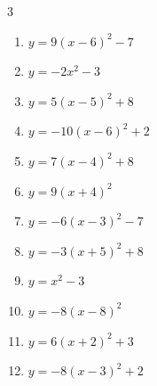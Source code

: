 \begin{multicols}{3}
\begin{enumerate}
  \item $\displaystyle y=9\left( x-6\right)^{2}-7$

        \phantom{$\displaystyle 頂点\left( 6 , -7 \right)$}

  \item $\displaystyle y=-2x^{2}-3$

        \phantom{$\displaystyle 頂点\left( 0 , -3 \right)$}

  \item $\displaystyle y=5\left( x-5\right)^{2}+8$

        \phantom{$\displaystyle 頂点\left( 5 , 8 \right)$}

  \item $\displaystyle y=-10\left( x-6\right)^{2}+2$

        \phantom{$\displaystyle 頂点\left( 6 , 2 \right)$}

  \item $\displaystyle y=7\left( x-4\right)^{2}+8$

        \phantom{$\displaystyle 頂点\left( 4 , 8 \right)$}

  \item $\displaystyle y=9\left( x+4\right)^{2}$

        \phantom{$\displaystyle 頂点\left( -4 , 0 \right)$}

  \item $\displaystyle y=-6\left( x-3\right)^{2}-7$

        \phantom{$\displaystyle 頂点\left( 3 , -7 \right)$}

  \item $\displaystyle y=-3\left( x+5\right)^{2}+8$

        \phantom{$\displaystyle 頂点\left( -5 , 8 \right)$}

  \item $\displaystyle y=x^{2}-3$

        \phantom{$\displaystyle 頂点\left( 0 , -3 \right)$}

  \item $\displaystyle y=-8\left( x-8\right)^{2}$

        \phantom{$\displaystyle 頂点\left( 8 , 0 \right)$}

  \item $\displaystyle y=6\left( x+2\right)^{2}+3$

        \phantom{$\displaystyle 頂点\left( -2 , 3 \right)$}

  \item $\displaystyle y=-8\left( x-3\right)^{2}+2$


\end{enumerate}
\end{multicols}
